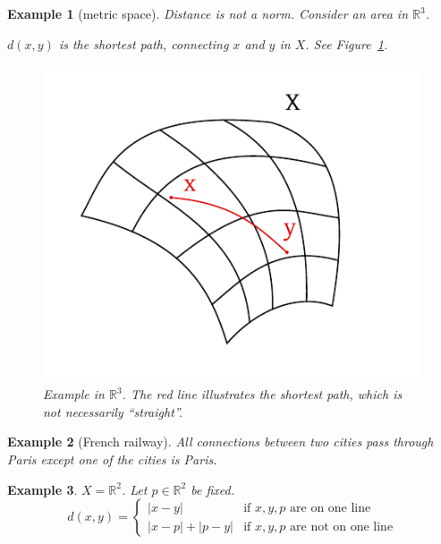 \documentclass{article}
\newtheorem{example}{Example}  \numberwithin{example}{section}
\newcommand{\card}[1]{\left|#1\right|}
\begin{document}
\begin{example}[metric space]
  Distance is not a norm.
  Consider an area in $\mathbb R^3$.

  $d(x,y)$ is the shortest path, connecting $x$ and $y$ in $X$.
  See Figure~\ref{img:example-r3}.

  \begin{figure}
    \begin{center}
      \includegraphics{img/01_example.pdf}
      \caption{Example in $\mathbb R^3$. The red line illustrates the shortest path, which is not necessarily \enquote{straight}.}
      \label{img:example-r3}
    \end{center}
  \end{figure}
\end{example}

\begin{example}[French railway]
  All connections between two cities pass through Paris except one of the cities is Paris.
\end{example}

\begin{example}
  $X = \mathbb R^2$. Let $p \in \mathbb R^2$ be fixed.
  \[
    d(x, y) = \begin{cases}
      \card{x - y}                & \text{if } x, y, p \text{ are on one line} \\
      \card{x - p} + \card{p - y} & \text{if } x, y, p \text{ are not on one line}
    \end{cases}
  \]
\end{example}
\end{document}
